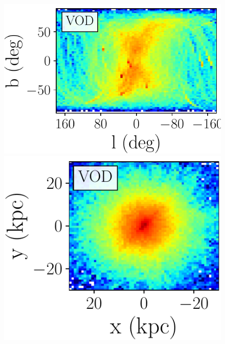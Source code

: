 \documentclass[fleqn,usenatbib]{mnras}
\begin{document}
\begin{figure}
             \\ \includegraphics[scale=0.302]{VOD_orbits_8Gyrs_lb_defaultmass.pdf}
             \includegraphics[scale=0.302]{VOD_orbits_8Gyrs_xy_defaultmass.pdf}

\end{figure}
\end{document}
